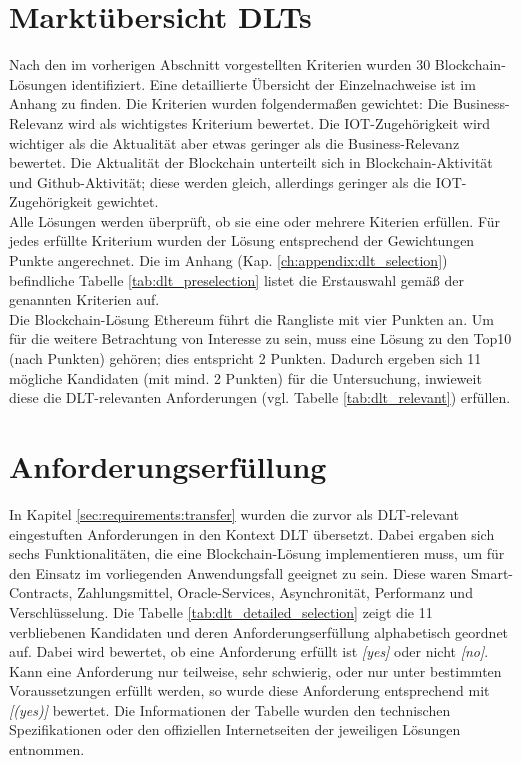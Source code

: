 %
%
\section{Marktübersicht DLTs}
\label{sec:dlt_selection:market}
Nach den im vorherigen Abschnitt vorgestellten Kriterien wurden 30 Blockchain-Lösungen identifiziert. Eine detaillierte Übersicht der Einzelnachweise ist im Anhang zu finden. Die Kriterien wurden folgendermaßen gewichtet: Die Business-Relevanz wird als wichtigstes Kriterium bewertet. Die IOT-Zugehörigkeit wird wichtiger als die Aktualität aber etwas geringer als die Business-Relevanz bewertet. Die Aktualität der Blockchain unterteilt sich in Blockchain-Aktivität und Github-Aktivität; diese werden gleich, allerdings geringer als die IOT-Zugehörigkeit gewichtet.\\
Alle Lösungen werden überprüft, ob sie eine oder mehrere Kiterien erfüllen. Für jedes erfüllte Kriterium wurden der Lösung entsprechend der Gewichtungen Punkte angerechnet. Die im Anhang (Kap. \ref{ch:appendix:dlt_selection}) befindliche Tabelle \ref{tab:dlt_preselection} listet die Erstauswahl gemäß der genannten Kriterien auf.\\
Die Blockchain-Lösung Ethereum führt die Rangliste mit vier Punkten an. Um für die weitere Betrachtung von Interesse zu sein, muss eine Lösung zu den Top10 (nach Punkten) gehören; dies entspricht 2 Punkten. Dadurch ergeben sich 11 mögliche Kandidaten (mit mind. 2 Punkten) für die Untersuchung, inwieweit diese die \ac{DLT}-relevanten Anforderungen (vgl. Tabelle \ref{tab:dlt_relevant}) erfüllen.

%
%
\section{Anforderungserfüllung}
\label{sec:dlt_selection:fullfilment}
In Kapitel \ref{sec:requirements:transfer} wurden die zurvor als \ac{DLT}-relevant eingestuften Anforderungen in den Kontext \ac{DLT} übersetzt. Dabei ergaben sich sechs Funktionalitäten, die eine Blockchain-Lösung implementieren muss, um für den Einsatz im vorliegenden Anwendungsfall geeignet zu sein. Diese waren Smart-Contracts, Zahlungsmittel, Oracle-Services, Asynchronität, Performanz und Verschlüsselung. Die Tabelle \ref{tab:dlt_detailed_selection} zeigt die 11 verbliebenen Kandidaten und deren Anforderungserfüllung alphabetisch geordnet auf. Dabei wird bewertet, ob eine Anforderung erfüllt ist \textit{[yes]} oder nicht \textit{[no]}. Kann eine Anforderung nur teilweise, sehr schwierig, oder nur unter bestimmten Voraussetzungen erfüllt werden, so wurde diese Anforderung entsprechend mit \textit{[(yes)]} bewertet. Die Informationen der Tabelle wurden den technischen Spezifikationen oder den offiziellen Internetseiten der jeweiligen Lösungen entnommen.

